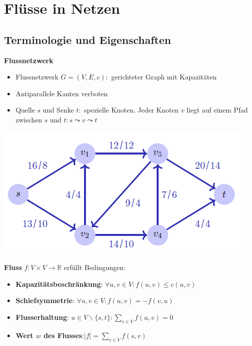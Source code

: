 \section{Flüsse in Netzen}

\begin{sectionbox}
\subsection{Terminologie und Eigenschaften}\medskip
\textbf{Flussnetzwerk}\par
\begin{itemize}
    \item Flussnetzwerk $G=(V, E, c):$ gerichteter Graph mit Kapazitäten
    \item Antiparallele Kanten verboten
    \item Quelle $s$ und Senke $t:$ spezielle Knoten. Jeder Knoten $v$ liegt auf einem Pfad zwischen $s$ und $t: s \leadsto v \leadsto t$
\end{itemize}\par\smallskip
\begin{center}
    \includegraphics[width = 0.9\columnwidth]{../img/flussNet.png}
\end{center}

\textbf{Fluss}  $f: V \times V \rightarrow \mathbb{R}$ erfüllt Bedingungen:\par
\begin{itemize}
    \item \textbf{Kapazitätsbeschränkung}: $\forall u, v \in V: f(u, v) \leq c(u, v)$
    \item \textbf{Schiefsymmetrie}: $\forall u, v \in V: f(u, v)=-f(v, u)$
    \item \textbf{Flusserhaltung}: $u \in V \backslash\{s, t\}: \sum_{v \in V} f(u, v)=0$
    \item \textbf{Wert $w$ des Flusses}:$|f|=\sum_{v \in V} f(s, v)$
\end{itemize}\par\smallskip


\end{sectionbox}
